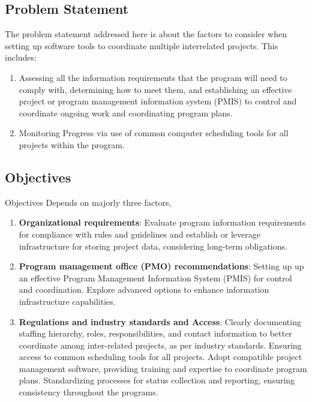 \documentclass{llncs}
\begin{document}
\subsection{Problem Statement}
The problem statement addressed here is about the factors to consider when setting up software tools to coordinate multiple interrelated projects. This includes:
\begin{enumerate}
  \item Assessing all the information requirements that the program will need to comply with, determining how to meet them, and establishing an effective project or program management information system (PMIS) to control and coordinate ongoing work and coordinating program plans.

 \item Monitoring Progress via use of common computer scheduling tools for all projects within the program.

\end{enumerate}


\subsection{Objectives}
Objectives Depends on majorly three factors,
\begin{enumerate}
\item \textbf{Organizational requirements}:
\subitem Evaluate program information requirements for compliance with rules and guidelines and establish or leverage infrastructure for storing project data, considering long-term obligations.
\item \textbf{Program management office (PMO) recommendations}: \subitem Setting up up an effective Program Management Information System (PMIS) for control and coordination.
\subitem Explore advanced options to enhance information infrastructure capabilities.
\item \textbf{Regulations and industry standards and Access}:
\subitem Clearly documenting staffing hierarchy, roles, responsibilities, and contact information to better coordinate among inter-related projects, as per industry standards.
\subitem Ensuring access to common scheduling tools for all projects.
\subitem Adopt compatible project management software, providing training and expertise to coordinate program plans.
\subitem Standardizing processes for status collection and reporting, ensuring consistency throughout the programs.

\end{enumerate}
\end{document}
